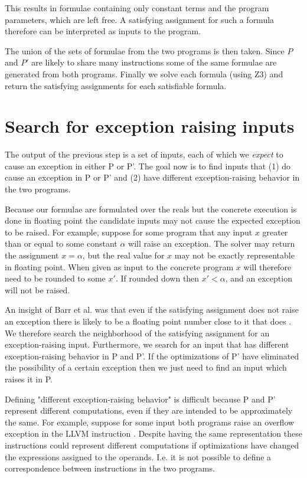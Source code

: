 \documentclass{article}
\begin{document}
This results in formulae containing only constant terms and the program
parameters, which are left free. A satisfying assignment for such a formula
therefore can be interpreted as inputs to the program.

The union of the sets of formulae from the two programs is then taken. Since $P$
and $P'$ are likely to share many instructions some of the same formulae are
generated from both programs. Finally we solve each formula (using Z3) and
return the satisfying assignments for each satisfiable formula.

\section{Search for exception raising inputs}

The output of the previous step is a set of inputs, each of which we
\textit{expect} to cause an exception in either P or P'. The goal now is to
find inputs that (1) do cause an exception in P or P' and (2) have different
exception-raising behavior in the two programs.

Because our formulae are formulated over the reals but the concrete execution is
done in floating point the candidate inputs may not cause the expected exception
to be raised. For example, suppose for some program that any input $x$ greater
than or equal to some constant $\alpha$ will raise an exception. The solver may
return the assignment $x = \alpha$, but the real value for $x$ may not be
exactly representable in floating point. When given as input to the concrete
program $x$ will therefore need to be rounded to some $x'$. If rounded down then
$x' < \alpha$, and an exception will not be raised.

An insight of Barr et al. was that even if the satisfying assignment does not
raise an exception there is likely to be a floating point number close to it
that does \cite[2]{barr_automatic_2013}. We therefore search the neighborhood of
the satisfying assignment for an exception-raising input. Furthermore, we search
for an input that has different exception-raising behavior in P and P'. If the
optimizations of P' have eliminated the possibility of a certain exception then
we just need to find an input which raises it in P.

Defining "different exception-raising behavior" is difficult because P and P'
represent different computations, even if they are intended to be approximately
the same. For example, suppose for some input both programs raise an overflow
exception in the LLVM instruction . Despite
having the same representation these instructions could represent different
computations if optimizations have changed the expressions assigned to the
operands. I.e. it is not possible to define a correspondence between
instructions in the two programs.
\end{document}
